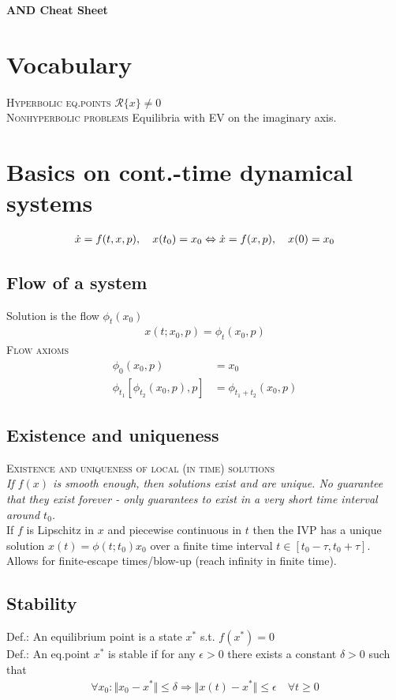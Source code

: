 \begin{center}
     \Large{\textbf{AND Cheat Sheet}} \\
\end{center}

\section{Vocabulary}
\textsc{Hyperbolic eq.points} $\mathcal{R}\{x\} \neq 0$ \\
\textsc{Nonhyperbolic problems} Equilibria with EV on the imaginary axis.

\section{Basics on cont.-time dynamical systems}
\begin{align*}
\dot{x} = f(t,x,p), \quad x(t_0) = x_0 \Leftrightarrow \dot{x} = f(x,p), \quad x(0)=x_0
\end{align*}
\subsection{Flow of a system}
Solution is the flow $\phi_t(x_0)$
\begin{align*}
x(t;x_0,p)=\phi_t(x_0,p)
\end{align*}
\textsc{Flow axioms}\\
\begin{align*}
\phi_0(x_0,p)&=x_0\\
\phi_{t_1}[\phi_{t_2}(x_0,p),p] &= \phi_{t_1+t_2}(x_0,p)
\end{align*}
\subsection{Existence and uniqueness}
\textsc{Existence and uniqueness of local (in time) solutions}\\
\emph{If $f(x)$ is smooth enough, then solutions exist and are unique. No guarantee that they exist forever - only guarantees to exist in a very short time interval around $t_0$.}\\
If $f$ is Lipschitz in $x$ and piecewise continuous in $t$ then the IVP has a unique solution $x(t)=\phi(t;t_0)x_0$ over a finite time interval $t\in[t_0-\tau,t_0+\tau]$.\\
Allows for finite-escape times/blow-up (reach infinity in finite time).

\subsection{Stability}
Def.: An equilibrium point is a state $x^*$ s.t. $f(x^*)=0$\\
Def.: An eq.point $x^*$ is stable if for any $\epsilon>0$ there exists a constant $\delta > 0$ such that \begin{align*}
\forall x_0: \Vert x_0 - x^* \Vert \leq \delta \Rightarrow \Vert x(t)-x^* \Vert \leq \epsilon \quad \forall t \geq 0
\end{align*}

